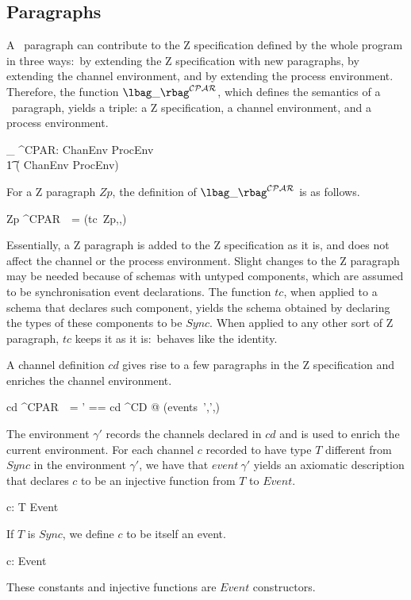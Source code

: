 \documentclass{article}
\begin{document}
\subsection{Paragraphs}

A \Circus\ paragraph can contribute to the Z specification defined by
the whole program in three ways:~by extending the Z specification with
new paragraphs, by extending the channel environment, and by extending
the process environment.  Therefore, the function \mbox{$\lbag\_
  \rbag^{\cal CPAR}$}, which defines the semantics of a \Circus\
paragraph, yields a triple: a Z specification, a channel environment,
and a process environment.
\begin{zed}
  \lbag\_ \rbag^{\cal CPAR}:  \pfun ChanEnv
  \pfun ProcEnv \pfun
  \\ %
  \t1 ( \times ChanEnv \times ProcEnv)
\end{zed}
For a Z paragraph $Zp$, the definition of \mbox{$\lbag\_ \rbag^{\cal
    CPAR}$} is as follows.
\begin{zed}
  \lbag Zp \rbag^{\cal CPAR}\ \gamma\ \rho = (tc~Zp,\gamma,\rho)
\end{zed}
Essentially, a Z paragraph is added to the Z specification as it is,
and does not affect the channel or the process environment.  Slight
changes to the Z paragraph may be needed because of schemas with
untyped components, which are assumed to be synchronisation event
declarations.  The function $tc$, when applied to a schema that
declares such component, yields the schema obtained by declaring the
types of these components to be $Sync$.  When applied to any other
sort of Z paragraph, $tc$ keeps it as it is:~behaves like the
identity.

A channel definition $cd$ gives rise to a few paragraphs in the Z
specification and enriches the channel environment.
\begin{zed}
  \lbag cd \rbag^{\cal CPAR}\ \gamma\ \rho = \LET \gamma' == \lbag cd
  \rbag^{\cal CD} @ (events~\gamma',\gamma \oplus \gamma',\rho)
\end{zed}
The environment $\gamma'$ records the channels declared in $cd$ and is
used to enrich the current environment.  For each channel $c$ recorded
to have type $T$ different from $Sync$ in the environment $\gamma'$,
we have that $event~\gamma'$ yields an axiomatic description that
declares $c$ to be an injective function from $T$ to $Event$.
\begin{axdef}
  c: T \inj Event
\end{axdef}
If $T$ is $Sync$, we define $c$ to be itself an event.
\begin{axdef}
  c: Event
\end{axdef}
These constants and injective functions are $Event$ constructors.
\end{document}
